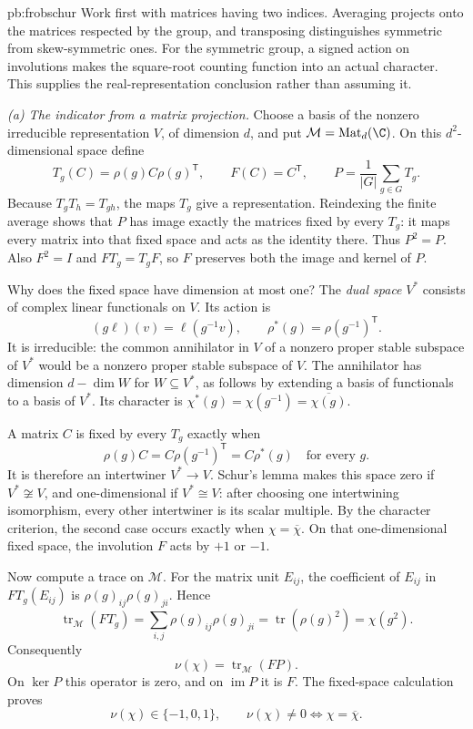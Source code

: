 \begin{solution}{pb:frobschur}
\idea Work first with matrices having two indices. Averaging projects onto the matrices respected by the group, and transposing distinguishes symmetric from skew-symmetric ones. For the symmetric group, a signed action on involutions makes the square-root counting function into an actual character. This supplies the real-representation conclusion rather than assuming it.

\writeup \emph{(a) The indicator from a matrix projection.}
Choose a basis of the nonzero irreducible representation $V$, of dimension $d$,
and put $\mathcal M=\operatorname{Mat}_d(\C)$. On this $d^2$-dimensional space define
\[
T_g(C)=\rho(g)C\rho(g)^{\mathsf T},
\qquad F(C)=C^{\mathsf T},
\qquad P=\frac1{|G|}\sum_{g\in G}T_g.
\]
Because $T_gT_h=T_{gh}$, the maps $T_g$ give a representation.
Reindexing the finite average shows that $P$ has image exactly the matrices
fixed by every $T_g$: it maps every matrix into that fixed space and acts
as the identity there. Thus $P^2=P$.
Also $F^2=I$ and $FT_g=T_gF$, so $F$ preserves both the image and kernel of $P$.

Why does the fixed space have dimension at most one?
The \emph{dual space} $V^*$ consists of complex linear functionals on $V$.
Its action is
\[
(g\ell)(v)=\ell(g^{-1}v),
\qquad \rho^*(g)=\rho(g^{-1})^{\mathsf T}.
\]
It is irreducible: the common annihilator in $V$ of a nonzero proper stable
subspace of $V^*$ would be a nonzero proper stable subspace of $V$.
The annihilator has dimension $d-\dim W$ for $W\subseteq V^*$, as follows
by extending a basis of functionals to a basis of $V^*$.
Its character is
$\chi^*(g)=\chi(g^{-1})=\overline{\chi(g)}$.

A matrix $C$ is fixed by every $T_g$ exactly when
\[
\rho(g)C=C\rho(g^{-1})^{\mathsf T}=C\rho^*(g)
\quad\text{for every }g.
\]
It is therefore an intertwiner $V^*\to V$. Schur's lemma makes this space
zero if $V^*\not\cong V$, and one-dimensional if $V^*\cong V$:
after choosing one intertwining isomorphism, every other intertwiner
is its scalar multiple. By the character criterion, the second case
occurs exactly when $\chi=\overline\chi$.
On that one-dimensional fixed space, the involution $F$ acts by $+1$ or $-1$.

Now compute a trace on $\mathcal M$. For the matrix unit $E_{ij}$,
the coefficient of $E_{ij}$ in $FT_g(E_{ij})$ is
$\rho(g)_{ij}\rho(g)_{ji}$. Hence
\[
\operatorname{tr}_{\mathcal M}(FT_g)
=\sum_{i,j}\rho(g)_{ij}\rho(g)_{ji}
=\operatorname{tr}(\rho(g)^2)=\chi(g^2).
\]
Consequently
\[
\nu(\chi)=\operatorname{tr}_{\mathcal M}(FP).
\]
On $\ker P$ this operator is zero, and on $\operatorname{im}P$ it is $F$.
The fixed-space calculation proves
\[
\boxed{\nu(\chi)\in\{-1,0,1\},\qquad
\nu(\chi)\ne0\iff\chi=\overline\chi.}
\]


\end{solution}
